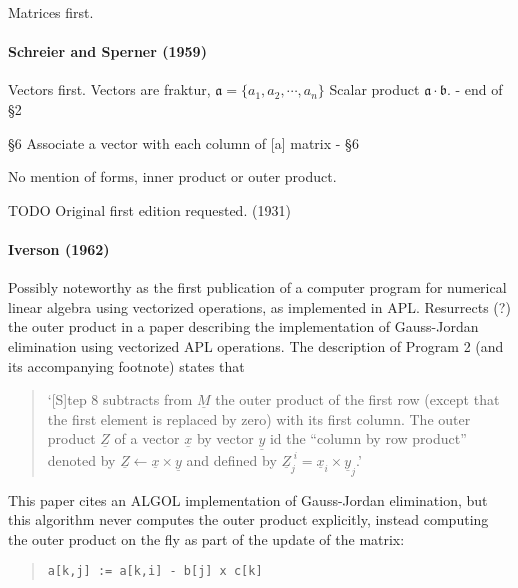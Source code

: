 Matrices first.

\paragraph{Schreier and Sperner (1959)~\cite{Schreier1959}}

Vectors first.
Vectors are fraktur, $\mathfrak a = \{a_1, a_2, \cdots, a_n\}$
Scalar product $\mathfrak a \cdot \mathfrak b$. - end of \S 2

\S6 Associate a vector with each column of [a] matrix - \S 6

No mention of forms, inner product or outer product.

TODO Original first edition requested. (1931)

\paragraph{Iverson (1962)~\cite{Iverson1962}}

Possibly noteworthy as the first publication of a computer program for numerical linear algebra using vectorized operations, as implemented in APL.
Resurrects (?) the outer product in a paper describing the implementation of Gauss-Jordan elimination using vectorized APL operations. The description of Program 2 (and its accompanying footnote) states that

\begin{quote}
`[S]tep 8 subtracts from $\underline{\textit{M}}$ the outer product of the first row (except that the first element is replaced by zero) with its first column. The outer product $\underline{\textit{Z}}$ of a vector $\underline{\textit{x}}$ by vector $\underline{\textit{y}}$ id the ``column by row product'' denoted by $\underline{\textit{Z}} \leftarrow \underline{\textit{x}} \times \underline{\textit{y}}$ and defined by $\underline{\textit{Z}}^{\; i}_j = \underline{\textit{x}}_i \times \underline{\textit{y}}_j$.'
\end{quote}

This paper cites an ALGOL implementation of Gauss-Jordan elimination, but this algorithm never computes the outer product explicitly, instead computing the outer product on the fly as part of the update of the matrix:~\cite{Cohen1961}

\begin{quote}
\begin{verbatim}
a[k,j] := a[k,i] - b[j] x c[k]
\end{verbatim}
\end{quote}

